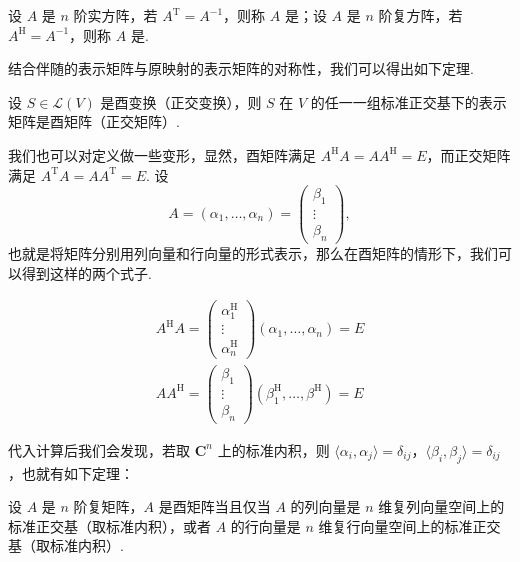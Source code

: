 \begin{definition}  
    设 $ A $ 是 $ n $ 阶实方阵，若 $ A^{\mathrm{T}} = A^{-1} $，则称 $ A $ 是；设 $ A $ 是 $ n $ 阶复方阵，若 $ A^\mathrm{H} = A^{-1} $，则称 $ A $ 是.
\end{definition}

结合伴随的表示矩阵与原映射的表示矩阵的对称性，我们可以得出如下定理.

\begin{theorem}
    设 $ S \in \mathcal{L}(V) $ 是酉变换（正交变换），则 $ S $ 在 $ V $ 的任一一组标准正交基下的表示矩阵是酉矩阵（正交矩阵）.
\end{theorem}

我们也可以对定义做一些变形，显然，酉矩阵满足 $ A^\mathrm{H}A = AA^\mathrm{H} = E $，而正交矩阵满足 $ A^{\mathrm{T}}A = AA^{\mathrm{T}} = E $. 设 \[
    A = (\alpha_1, \ldots, \alpha_n) = \begin{pmatrix}
        \beta_1 \\
        \vdots  \\
        \beta_n
    \end{pmatrix},
\]
也就是将矩阵分别用列向量和行向量的形式表示，那么在酉矩阵的情形下，我们可以得到这样的两个式子.

\begin{gather*}
    A^{\mathrm{H}}A = \begin{pmatrix}
        \alpha_1^{\mathrm{H}} \\
        \vdots             \\
        \alpha_n^{\mathrm{H}}
    \end{pmatrix} (\alpha_1, \ldots, \alpha_n) = E \\
    AA^{\mathrm{H}} = \begin{pmatrix}
        \beta_1 \\
        \vdots  \\
        \beta_n
    \end{pmatrix} (\beta_1^{\mathrm{H}}, \ldots, \beta^{\mathrm{H}}) = E
\end{gather*}

代入计算后我们会发现，若取 $ \mathbf{C}^n $ 上的标准内积，则 $ \langle \alpha_i, \alpha_j \rangle = \delta_{ij} $，$ \langle \beta_i, \beta_j \rangle = \delta_{ij} $，也就有如下定理：

\begin{theorem}
    设 $ A $ 是 $ n $ 阶复矩阵，$ A $ 是酉矩阵当且仅当 $ A $ 的列向量是 $ n $ 维复列向量空间上的标准正交基（取标准内积），或者 $ A $ 的行向量是 $ n $ 维复行向量空间上的标准正交基（取标准内积）.
\end{theorem}

